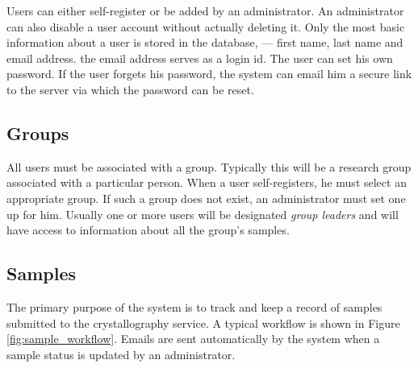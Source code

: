 \documentclass[12pt,twoside]{article}
\begin{document}
Users can either self-register or be added by an administrator.
An administrator can also disable a user account without actually
deleting it.
Only the most basic information about a user is stored in the database,
--- first name, last name and email address. the email address serves
as a login id. The user can set his own password. If the user forgets his
password, the system can email him a secure link to the server via which
the password can be reset.

\subsection{Groups}

All users must be associated with a group. Typically this will be a
research group associated with a particular person. When a user self-registers,
he must select an appropriate group. If such a group does not exist, an
administrator must set one up for him. Usually one or more users will be
designated \emph{group leaders} and will have access to information
about all the group's samples.

\subsection{Samples}

The primary purpose of the system is to track and keep a record of
samples submitted to the crystallography service. A typical workflow is
shown in Figure \ref{fig:sample_workflow}.
Emails are sent automatically by the system when a sample status
is updated by an administrator.
\end{document}

